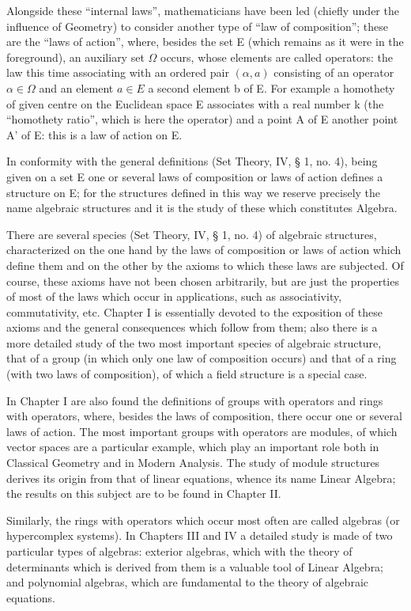 Alongside these ``internal laws'', mathematicians have been led (chiefly under the influence of Geometry) to consider another type of ``law of composition''; these are the ``laws of action'', where, besides the set E (which remains as it were in the foreground), an auxiliary set \(\Omega\) occurs, whose elements are called operators: the law this time associating with an ordered pair \((\alpha, a)\) consisting of an operator \(\alpha \in \Omega\) and an element \(a \in E\) a second element b of E. For example a homothety of given centre on the Euclidean space E associates with a real number k (the ``homothety ratio'', which is here the operator) and a point A of E another point A' of E: this is a law of action on E.

In conformity with the general definitions (Set Theory, IV, § 1, no. 4), being given on a set E one or several laws of composition or laws of action defines a structure on E; for the structures defined in this way we reserve precisely the name algebraic structures and it is the study of these which constitutes Algebra.

There are several species (Set Theory, IV, § 1, no. 4) of algebraic structures, characterized on the one hand by the laws of composition or laws of action which define them and on the other by the axioms to which these laws are subjected. Of course, these axioms have not been chosen arbitrarily, but are just the properties of most of the laws which occur in applications, such as associativity, commutativity, etc. Chapter I is essentially devoted to the exposition of these axioms and the general consequences which follow from them; also there is a more detailed study of the two most important species of algebraic structure, that of a group (in which only one law of composition occurs) and that of a ring (with two laws of composition), of which a field structure is a special case.

In Chapter I are also found the definitions of groups with operators and rings with operators, where, besides the laws of composition, there occur one or several laws of action. The most important groups with operators are modules, of which vector spaces are a particular example, which play an important role both in Classical Geometry and in Modern Analysis. The study of module structures derives its origin from that of linear equations, whence its name Linear Algebra; the results on this subject are to be found in Chapter II.

Similarly, the rings with operators which occur most often are called algebras (or hypercomplex systems). In Chapters III and IV a detailed study is made of two particular types of algebras: exterior algebras, which with the theory of determinants which is derived from them is a valuable tool of Linear Algebra; and polynomial algebras, which are fundamental to the theory of algebraic equations.

